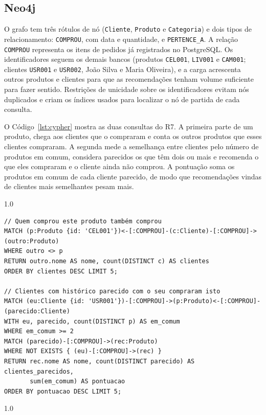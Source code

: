 \documentclass[12pt,a4paper,oneside]{article}
\newcommand{\fonte}[1]{%
  \begin{spacing}{1.0}\noindent{\footnotesize Fonte: #1.}\end{spacing}%
  \vspace{4pt}%
}
\begin{document}
\subsection{Neo4j}

O grafo tem três rótulos de nó (\texttt{Cliente}, \texttt{Produto} e \texttt{Categoria}) e dois tipos de relacionamento: \texttt{COMPROU}, com data e quantidade, e \texttt{PERTENCE\_A}. A relação \texttt{COMPROU} representa os itens de pedidos já registrados no PostgreSQL. Os identificadores seguem os demais bancos (produtos \texttt{CEL001}, \texttt{LIV001} e \texttt{CAM001}; clientes \texttt{USR001} e \texttt{USR002}, João Silva e Maria Oliveira), e a carga acrescenta outros produtos e clientes para que as recomendações tenham volume suficiente para fazer sentido. Restrições de unicidade sobre os identificadores evitam nós duplicados e criam os índices usados para localizar o nó de partida de cada consulta.

O Código~\ref{lst:cypher} mostra as duas consultas do R7. A primeira parte de um produto, chega aos clientes que o compraram e conta os outros produtos que esses clientes compraram. A segunda mede a semelhança entre clientes pelo número de produtos em comum, considera parecidos os que têm dois ou mais e recomenda o que eles compraram e o cliente ainda não comprou. A pontuação soma os produtos em comum de cada cliente parecido, de modo que recomendações vindas de clientes mais semelhantes pesam mais.

\noindent\begin{minipage}{\linewidth}
\begin{spacing}{1.0}
\begin{lstlisting}[caption={Consultas de recomendação do R7}, label={lst:cypher}]
// Quem comprou este produto também comprou
MATCH (p:Produto {id: 'CEL001'})<-[:COMPROU]-(c:Cliente)-[:COMPROU]->(outro:Produto)
WHERE outro <> p
RETURN outro.nome AS nome, count(DISTINCT c) AS clientes
ORDER BY clientes DESC LIMIT 5;

// Clientes com histórico parecido com o seu compraram isto
MATCH (eu:Cliente {id: 'USR001'})-[:COMPROU]->(p:Produto)<-[:COMPROU]-(parecido:Cliente)
WITH eu, parecido, count(DISTINCT p) AS em_comum
WHERE em_comum >= 2
MATCH (parecido)-[:COMPROU]->(rec:Produto)
WHERE NOT EXISTS { (eu)-[:COMPROU]->(rec) }
RETURN rec.nome AS nome, count(DISTINCT parecido) AS clientes_parecidos,
       sum(em_comum) AS pontuacao
ORDER BY pontuacao DESC LIMIT 5;
\end{lstlisting}
\end{spacing}
\end{minipage}
\fonte{Elaborado pelos autores (2026)}
\end{document}

